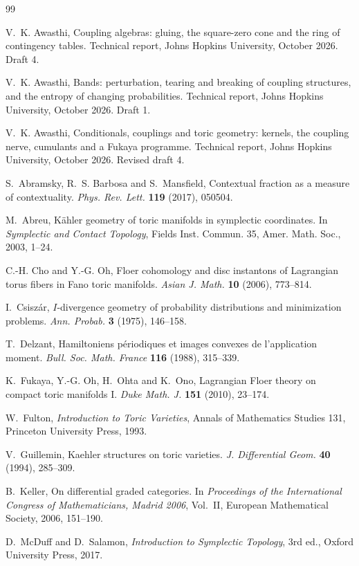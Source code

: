 \documentclass[11pt]{article}
\theoremstyle{definition}
\theoremstyle{remark}
\begin{document}
\begin{thebibliography}{99}

V.~K. Awasthi, Coupling algebras: gluing, the square-zero cone and the ring of contingency tables. Technical report, Johns
Hopkins University, October 2026. Draft 4.

V.~K. Awasthi, Bands: perturbation, tearing and breaking of coupling structures, and the entropy of changing probabilities.
Technical report, Johns Hopkins University, October 2026. Draft 1.

V.~K. Awasthi, Conditionals, couplings and toric geometry: kernels, the coupling nerve, cumulants and a {F}ukaya
programme. Technical report, Johns Hopkins University, October 2026. Revised draft 4.

S.~Abramsky, R.~S. Barbosa and S.~Mansfield, Contextual fraction as a measure of contextuality. \emph{Phys. Rev. Lett.}
\textbf{119} (2017), 050504.

M.~Abreu, Kähler geometry of toric manifolds in symplectic coordinates. In \emph{Symplectic and Contact Topology}, Fields Inst.
Commun. 35, Amer. Math. Soc., 2003, 1--24.

C.-H. Cho and Y.-G. Oh, Floer cohomology and disc instantons of Lagrangian torus fibers in Fano toric manifolds. \emph{Asian J.
Math.} \textbf{10} (2006), 773--814.

I.~Csiszár, {$I$}-divergence geometry of probability distributions and minimization problems. \emph{Ann. Probab.} \textbf{3}
(1975), 146--158.

T.~Delzant, Hamiltoniens périodiques et images convexes de l'application moment. \emph{Bull. Soc. Math. France} \textbf{116}
(1988), 315--339.

K.~Fukaya, Y.-G. Oh, H.~Ohta and K.~Ono, Lagrangian Floer theory on compact toric manifolds {I}. \emph{Duke Math. J.} \textbf{151}
(2010), 23--174.

W.~Fulton, \emph{Introduction to Toric Varieties}, Annals of Mathematics Studies 131, Princeton University Press, 1993.

V.~Guillemin, Kaehler structures on toric varieties. \emph{J. Differential Geom.} \textbf{40} (1994), 285--309.

B.~Keller, On differential graded categories. In \emph{Proceedings of the International Congress of Mathematicians, Madrid 2006},
Vol.~II, European Mathematical Society, 2006, 151--190.

D.~McDuff and D.~Salamon, \emph{Introduction to Symplectic Topology}, 3rd ed., Oxford University Press, 2017.

\end{thebibliography}
\end{document}
